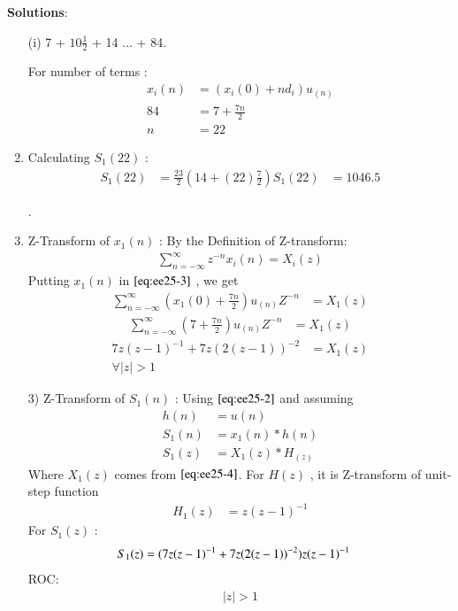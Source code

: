 \documentclass[journal,12pt,twocolumn]{IEEEtran}
\theoremstyle{remark}
\begin{document}
\vspace{0.5cm}
\textbf{Solutions}:
\begin{enumerate}
\item[(i)]   
7 + $10\frac{1}{2}$ + 14 ... + 84.

\vspace{0.15cm}
For number of terms :
\begin{align}
x_i(n) &= (x_i(0) + nd_i)u_{(n)}\label{eq:ee25-2}\\
84 &= 7+\frac{7n}{2}\\
n &= 22
\end{align}
\item 
Calculating $S_1(22)$ : 
\begin{align}
    S_1{(22)} &= \frac{23}{2}(14+(22)\frac{7}{2})
    S_1{(22)} &= 1046.5
    \end{align} 

\newpage
.
\vspace{12cm}
\item 
Z-Transform of $x_1(n)$ :
\vspace{0.2cm}
By the Definition of Z-transform:
\begin{align}
 \sum_{n=-\infty}^{\infty} z^{-n}x_i(n) = X_i(z)\label{eq:ee25-3}
 \end{align}
\vspace{0.05cm}Putting $x_1(n)$ in $\eqref{eq:ee25-3}$ , we get \vspace{0.05cm}
\begin{align}
     \sum_{n=-\infty}^{\infty}(x_1(0) + \frac{7n}{2})u_{(n)}Z^{-n} &= X_1(z)
\end{align}
\begin{align}
\sum_{n=-\infty}^{\infty}(7 + \frac{7n}{2})u_{(n)}Z^{-n} &= X_1(z)
\end{align}
\begin{align}
7z(z-1)^{-1} + 7z(2(z-1))^{-2} &= X_1(z) \label{eq:ee25-4}\\
\forall \lvert z \rvert  >  1 
\end{align}
\item[3)]
Z-Transform of $S_1(n)$ :
Using $\eqref{eq:ee25-2}$ and assuming 
\begin{align}
         h(n) &= u(n) \\
    S_1(n) &= x_1(n) * h(n) \\
    S_1(z) &= X_1(z) * H_(z)
    \end{align}
    Where $X_1(z)$ comes from $\eqref{eq:ee25-4}$.
    \vspace{0.05cm}
    For $H(z)$ , it is Z-transform of unit-step function
    \begin{align}
        H_1(z) &= z(z-1)^{-1} \label{eq:ee25-9}
    \end{align}
    For $S_1(z)$ :
    \begin{align}
S_1(z) &= \notag(7z(z-1)^{-1}+
7z(2(z-1))^{-2})z(z-1)^{-1}
    \end{align}
    ROC:
    \begin{align} 
    \lvert z \rvert > 1
    \end{align}
    

\end{enumerate}
\end{document}
